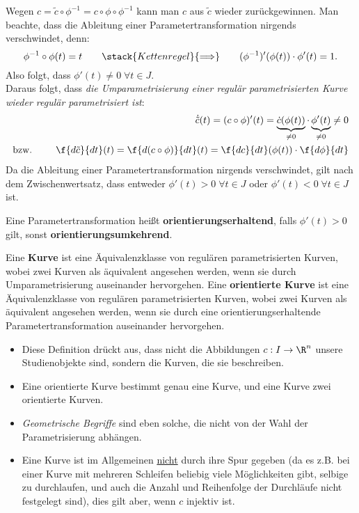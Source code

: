 \documentclass{mycourse}
\begin{document}
\begin{note}
Wegen $c = \tilde c \circ \phi^{-1} = c \circ \phi \circ \phi^{-1}$ kann man $c$ aus $\tilde c$ wieder zurückgewinnen. Man beachte, dass die Ableitung einer Parametertransformation nirgends verschwindet, denn:
\[ \phi^{-1} \circ \phi(t) = t \qquad \stack{Kettenregel}{\Longrightarrow} \qquad  (\phi^{-1})' (\phi(t)) \cdot \phi'(t) = 1. \]
Also folgt, dass $\phi'(t) \neq 0 \; \forall t \in J$. \\
Daraus folgt, dass \emph{die Umparametrisierung einer regulär parametrisierten Kurve wieder regulär parametrisiert ist}: 
\begin{align*}
\dot{\tilde{c}}(t) = (c \circ \phi)' (t) = \underbrace{\dot c(\phi(t))}_{\neq 0} \cdot \underbrace{\phi'(t)}_{\neq 0} \neq 0 \\
\text{bzw. } \qquad  \f{d \tilde c}{dt} (t) = \f{d(c \circ \phi)}{dt} (t) = \f{dc}{dt} (\phi (t)) \cdot \f{d \phi}{dt}
\end{align*}
Da die Ableitung einer Parametertransformation nirgends verschwindet, gilt nach dem Zwischenwertsatz, dass entweder $\phi'(t) > 0 \; \forall t \in J$ oder $\phi'(t) < 0 \; \forall t \in J$ ist.
\end{note}

\begin{df}
Eine Parametertransformation heißt \textbf{orientierungserhaltend}, falls $\phi'(t) > 0$ gilt, sonst \textbf{orientierungsumkehrend}.
\end{df}

\begin{df}
Eine \textbf{Kurve}  ist eine Äquivalenzklasse von regulären parametrisierten Kurven, wobei zwei Kurven als äquivalent angesehen werden, wenn sie durch Umparametrisierung auseinander hervorgehen. Eine \textbf{orientierte Kurve} ist eine Äquivalenzklasse von regulären parametrisierten Kurven, wobei zwei Kurven als äquivalent angesehen werden, wenn sie durch eine orientierungserhaltende Parametertransformation auseinander hervorgehen.
\end{df}

\begin{note}
\begin{itemize}
	\item Diese Definition drückt aus, dass nicht die Abbildungen $c: I \to \R^n$ unsere Studienobjekte sind, sondern die Kurven, die sie beschreiben.
	\item Eine orientierte Kurve bestimmt genau eine Kurve, und eine Kurve zwei orientierte Kurven.
	\item \emph{Geometrische Begriffe} sind eben solche, die nicht von der Wahl der Parametrisierung abhängen.
	\item Eine Kurve ist im Allgemeinen \underline{nicht} durch ihre Spur gegeben (da es z.B. bei einer Kurve mit mehreren Schleifen beliebig viele Möglichkeiten gibt, selbige zu durchlaufen, und auch die Anzahl und Reihenfolge der Durchläufe nicht festgelegt sind), dies gilt aber, wenn $c$ injektiv ist.
\end{itemize}
\end{note}
\end{document}
